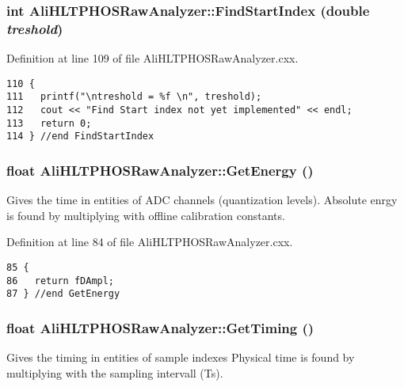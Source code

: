 \subsubsection{\setlength{\rightskip}{0pt plus 5cm}int Ali\-HLTPHOSRaw\-Analyzer::Find\-Start\-Index (double {\em treshold})}\label{classAliHLTPHOSRawAnalyzer_AliHLTPHOSRawAnalyzerPeakFindera9}




Definition at line 109 of file Ali\-HLTPHOSRaw\-Analyzer.cxx.

\footnotesize\begin{verbatim}110 {
111   printf("\ntreshold = %f \n", treshold);
112   cout << "Find Start index not yet implemented" << endl;
113   return 0;
114 } //end FindStartIndex
\end{verbatim}\normalsize 


\subsubsection{\setlength{\rightskip}{0pt plus 5cm}float Ali\-HLTPHOSRaw\-Analyzer::Get\-Energy ()}\label{classAliHLTPHOSRawAnalyzer_AliHLTPHOSRawAnalyzerPeakFindera11}


Gives the time in entities of ADC channels (quantization levels). Absolute enrgy is found by multiplying with offline calibration constants. 

Definition at line 84 of file Ali\-HLTPHOSRaw\-Analyzer.cxx.

\footnotesize\begin{verbatim}85 {
86   return fDAmpl;
87 } //end GetEnergy
\end{verbatim}\normalsize 


\subsubsection{\setlength{\rightskip}{0pt plus 5cm}float Ali\-HLTPHOSRaw\-Analyzer::Get\-Timing ()}\label{classAliHLTPHOSRawAnalyzer_AliHLTPHOSRawAnalyzerPeakFindera10}


Gives the timing in entities of sample indexes Physical time is found by multiplying with the sampling intervall (Ts). 

